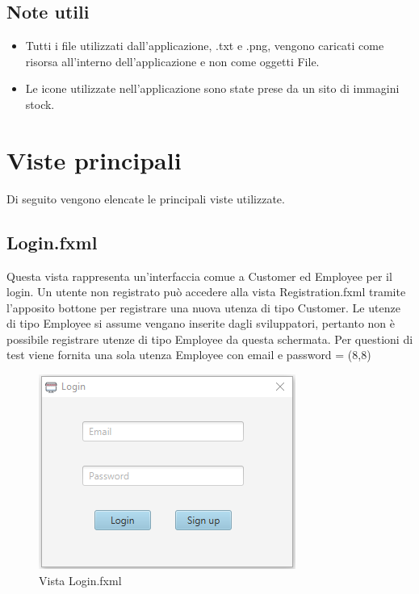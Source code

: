 \documentclass[12pt]{article}
\begin{document}
\subsection{Note utili}
\begin{itemize}
\item Tutti i file utilizzati dall'applicazione, .txt e .png, vengono caricati come risorsa all'interno dell'applicazione e non come oggetti File.
\item Le icone utilizzate nell'applicazione sono state prese da un sito di immagini stock.
\end{itemize}

\section{Viste principali}
Di seguito vengono elencate le principali viste utilizzate.
\subsection{Login.fxml}
Questa vista rappresenta un'interfaccia comue a Customer ed Employee per il login. Un utente non registrato può accedere alla vista Registration.fxml tramite l'apposito bottone per registrare una nuova utenza di tipo Customer. Le utenze di tipo Employee si assume vengano inserite dagli sviluppatori, pertanto non è possibile registrare utenze di tipo Employee da questa schermata. Per questioni di test viene fornita una sola utenza Employee con email e password = (8,8)

\begin{figure}[h!]
	\begin{center}
 	 	\includegraphics[keepaspectratio]{media/views/login.png}
  	 	 \caption{Vista Login.fxml}
	\end{center}
\end{figure}


\clearpage
\end{document}
